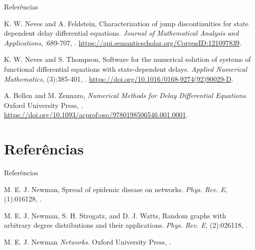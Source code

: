 \documentclass{beamer}
\theoremstyle{plain}
\theoremstyle{definition}
\begin{document}

\begin{frame}{Referências}


\begin{thebibliography}{3}



\beamertemplatearticlebibitems
{}
K. W. Neves and A. Feldstein,
\newblock Characterization of jump discontinuities for state dependent delay differential equations.
\newblock \emph{Journal of Mathematical Analysis and Applications},
:689-707,
.
\newblock \url{https://api.semanticscholar.org/CorpusID:121097839}.


\beamertemplatearticlebibitems
{}
K. W. Neves and S. Thompson,
\newblock Software for the numerical solution of systems of functional differential equations with state-dependent delays.
\newblock \emph{Applied Numerical Mathematics},
(3):385-401,
.
\newblock \url{https://doi.org/10.1016/0168-9274(92)90029-D}.


\beamertemplatebookbibitems
{}
A. Bellen and M. Zennaro,
\newblock \emph{Numerical Methods for Delay Differential Equations}.
\newblock Oxford University Press,
.
\newblock \url{https://doi.org/10.1093/acprof:oso/9780198506546.001.0001}.
 
\end{thebibliography}
\end{frame}



\section{Referências}
\begin{frame}{Referências}


\begin{thebibliography}{4}

\beamertemplatearticlebibitems
{}
M. E. J. Newman,
\newblock Spread of epidemic disease on networks.
\newblock\emph{Phys. Rev. E},
(1):016128,
.

\beamertemplatearticlebibitems
{}
M. E. J. Newman, S. H. Strogatz, and D. J. Watts,
\newblock Random graphs with arbitrary degree distributions and their applications.
\newblock\emph{Phys. Rev. E},
(2):026118,
.


\beamertemplatebookbibitems
{}M. E. J. Newman \newblock\emph{Networks}.\newblock
\textlatin{Oxford University Press, }.

\end{thebibliography}
\end{frame}



\end{document}
